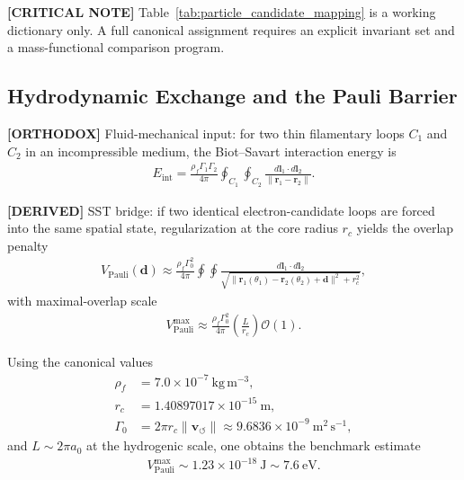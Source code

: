 \documentclass[11pt]{article}
\theoremstyle{definition}
\theoremstyle{plain}
\theoremstyle{remark}
\begin{document}
        \textbf{[CRITICAL NOTE]} Table~\ref{tab:particle_candidate_mapping} is a working dictionary only. A full canonical
        assignment requires an explicit invariant set and a mass-functional comparison program.

    \subsection{Hydrodynamic Exchange and the Pauli Barrier}
        \label{subsec:integration_pauli}

        \textbf{[ORTHODOX]} Fluid-mechanical input: for two thin filamentary loops \(C_1\) and \(C_2\) in an
        incompressible medium, the Biot--Savart interaction energy is \cite{Batchelor1967}
        \begin{align}
            E_{\mathrm{int}}
            =
            \frac{\rho_{\!f}\Gamma_1\Gamma_2}{4\pi}
            \oint_{C_1}\oint_{C_2}
            \frac{d\mathbf{l}_1\cdot d\mathbf{l}_2}
            {\lVert \mathbf{r}_1 - \mathbf{r}_2 \rVert}.
            \label{eq:biot_savart_interaction}
        \end{align}

        \textbf{[DERIVED]} SST bridge: if two identical electron-candidate loops are forced into the same spatial state,
        regularization at the core radius \(r_c\) yields the overlap penalty
        \begin{align}
            V_{\mathrm{Pauli}}(\mathbf{d})
            \approx
            \frac{\rho_{\!f}\Gamma_0^2}{4\pi}
            \oint\!\!\oint
            \frac{d\mathbf{l}_1\cdot d\mathbf{l}_2}
            {\sqrt{\lVert \mathbf{r}_1(\theta_1)-\mathbf{r}_2(\theta_2)+\mathbf{d}\rVert^2+r_c^2}},
            \label{eq:pauli_barrier_regularized}
        \end{align}
        with maximal-overlap scale
        \begin{align}
            V_{\mathrm{Pauli}}^{\max}
            \approx
            \frac{\rho_{\!f}\Gamma_0^2}{4\pi}\left(\frac{L}{r_c}\right)\mathcal{O}(1).
            \label{eq:pauli_barrier_scale}
        \end{align}

        Using the canonical values
        \begin{align}
            \rho_{\!f} &= 7.0 \times 10^{-7}\ \mathrm{kg\,m^{-3}}, \nonumber\\
            r_c &= 1.40897017 \times 10^{-15}\ \mathrm{m}, \nonumber\\
            \Gamma_0 &= 2\pi r_c \lVert \mathbf{v}_{\!\boldsymbol{\circlearrowleft}} \rVert
            \approx 9.6836\times 10^{-9}\ \mathrm{m^2\,s^{-1}},
        \end{align}
        and \(L \sim 2\pi a_0\) at the hydrogenic scale, one obtains the benchmark estimate
        \begin{align}
            V_{\mathrm{Pauli}}^{\max}
            \sim 1.23\times 10^{-18}\ \mathrm{J}
            \sim 7.6\ \mathrm{eV}.
            \label{eq:pauli_barrier_numeric}
        \end{align}
\end{document}
